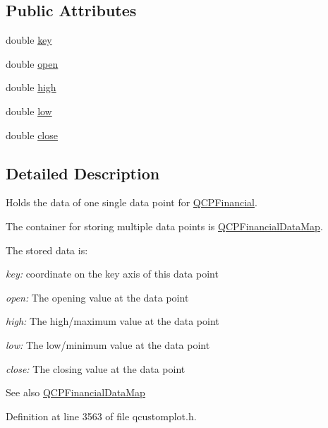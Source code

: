 \subsection*{Public Attributes}
\begin{DoxyCompactItemize}
\item 
double \hyperlink{class_q_c_p_financial_data_a18bc92126f28c214b05b0161e5f5958b}{key}
\item 
double \hyperlink{class_q_c_p_financial_data_a3059e1e1fbcb9fd243fde0450f238032}{open}
\item 
double \hyperlink{class_q_c_p_financial_data_a299a4b241296fb6cd1baf5ab03f7126a}{high}
\item 
double \hyperlink{class_q_c_p_financial_data_aecce0fb45a115e3f3a25eea78491ac16}{low}
\item 
double \hyperlink{class_q_c_p_financial_data_a45e9b96944c4a08ea6c82a72d3d22df2}{close}
\end{DoxyCompactItemize}


\subsection{Detailed Description}
Holds the data of one single data point for \hyperlink{class_q_c_p_financial}{Q\+C\+P\+Financial}. 

The container for storing multiple data points is \hyperlink{qcustomplot_8h_a745c09823fae0974b50beca9bc3b3d7d}{Q\+C\+P\+Financial\+Data\+Map}.

The stored data is\+: \begin{DoxyItemize}
\item {\itshape key\+:} coordinate on the key axis of this data point \item {\itshape open\+:} The opening value at the data point \item {\itshape high\+:} The high/maximum value at the data point \item {\itshape low\+:} The low/minimum value at the data point \item {\itshape close\+:} The closing value at the data point\end{DoxyItemize}
\begin{DoxySeeAlso}{See also}
\hyperlink{qcustomplot_8h_a745c09823fae0974b50beca9bc3b3d7d}{Q\+C\+P\+Financial\+Data\+Map} 
\end{DoxySeeAlso}


Definition at line 3563 of file qcustomplot.\+h.



